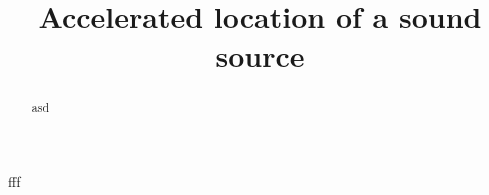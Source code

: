 \documentclass[a4paper]{article}
\title{Accelerated location of a sound source}
\date{}
\begin{document}
\maketitle
\begin{abstract}
  asd
\end{abstract}

fff
\end{document}
